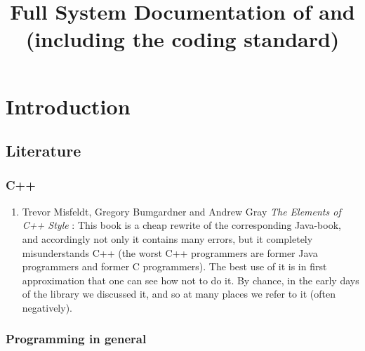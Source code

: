 \documentclass{book}
\title{Full System Documentation of \OKlibrary{} and \OKplatform{} (including the coding standard)}
\begin{document}
\maketitle

\tableofcontents



\chapter{Introduction}
\label{cha:About}


\section{Literature}
\label{sec:IntroLiterature}

\subsection{C++}
\label{sec:IntroLiteratureCpp}

\begin{enumerate}
\item Trevor Misfeldt, Gregory Bumgardner and Andrew Gray \textit{The Elements of C++ Style} \cite{OKL_MisfeldtBumgardnerGray2004CppStyle}: This book is a cheap rewrite of the corresponding Java-book, and accordingly not only it contains many errors, but it completely misunderstands C++ (the worst C++ programmers are former Java programmers and former C programmers). The best use of it is in first approximation that one can see how not to do it. By chance, in the early days of the library we discussed it, and so at many places we refer to it (often negatively).
\end{enumerate}




\subsection{Programming in general}
\label{sec:IntroLiteratureProgramminggeneral}
\end{document}
